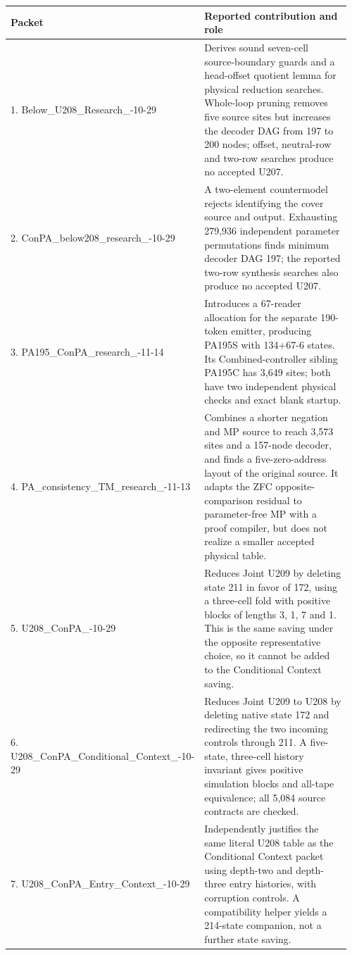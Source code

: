 \begin{longtable}{@{}p{0.35\linewidth}p{0.61\linewidth}@{}}
\toprule Packet & Reported contribution and role\\ 
\midrule\endhead
1. Below\_\allowbreak U208\_\allowbreak Research\_\allowbreak 2026-10-29 & Derives sound seven-cell source-boundary guards and a head-offset quotient lemma for physical reduction searches. Whole-loop pruning removes five source sites but increases the decoder DAG from 197 to 200 nodes; offset, neutral-row and two-row searches produce no accepted U207.\\[4pt]
2. ConPA\_\allowbreak below208\_\allowbreak research\_\allowbreak 2026-10-29 & A two-element countermodel rejects identifying the cover source and output. Exhausting 279,936 independent parameter permutations finds minimum decoder DAG 197; the reported two-row synthesis searches also produce no accepted U207.\\[4pt]
3. PA195\_\allowbreak ConPA\_\allowbreak research\_\allowbreak 2026-11-14 & Introduces a 67-reader allocation for the separate 190-token emitter, producing PA195S with 134+67-6 states. Its Combined-controller sibling PA195C has 3,649 sites; both have two independent physical checks and exact blank startup.\\[4pt]
4. PA\_\allowbreak consistency\_\allowbreak TM\_\allowbreak research\_\allowbreak 2026-11-13 & Combines a shorter negation and MP source to reach 3,573 sites and a 157-node decoder, and finds a five-zero-address layout of the original source. It adapts the ZFC opposite-comparison residual to parameter-free MP with a proof compiler, but does not realize a smaller accepted physical table.\\[4pt]
5. U208\_\allowbreak ConPA\_\allowbreak 2026-10-29 & Reduces Joint U209 by deleting state 211 in favor of 172, using a three-cell fold with positive blocks of lengths 3, 1, 7 and 1. This is the same saving under the opposite representative choice, so it cannot be added to the Conditional Context saving.\\[4pt]
6. U208\_\allowbreak ConPA\_\allowbreak Conditional\_\allowbreak Context\_\allowbreak 2026-10-29 & Reduces Joint U209 to U208 by deleting native state 172 and redirecting the two incoming controls through 211. A five-state, three-cell history invariant gives positive simulation blocks and all-tape equivalence; all 5,084 source contracts are checked.\\[4pt]
7. U208\_\allowbreak ConPA\_\allowbreak Entry\_\allowbreak Context\_\allowbreak 2026-10-29 & Independently justifies the same literal U208 table as the Conditional Context packet using depth-two and depth-three entry histories, with corruption controls. A compatibility helper yields a 214-state companion, not a further state saving.\\[4pt]

\end{longtable}
